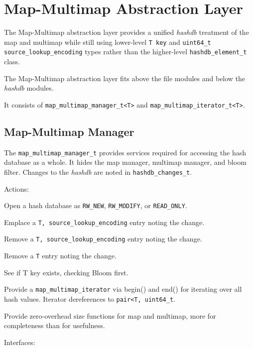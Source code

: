 \documentclass[12pt,twoside]{article}
\newcommand{\hdb}{\emph{hashdb}\xspace}
\begin{document}
\section{Map-Multimap Abstraction Layer}
\begin{compactitem}
\item The Map-Multimap abstraction layer
provides a unified \hdb treatment of the map and multimap
while still using lower-level \texttt{T key}
and \texttt{uint64\_t source\_lookup\_encoding} types
rather than the higher-level \texttt{hashdb\_element\_t} class.
\item The Map-Multimap abstraction layer fits above the file modules
and below the \hdb modules.
\item It consists of \texttt{map\_multimap\_manager\_t<T>}
and \texttt{map\_multimap\_iterator\_t<T>}.
\end{compactitem}

\subsection{Map-Multimap Manager}
The \texttt{map\_multimap\_manager\_t}
provides services required for accessing the hash database
as a whole.  It hides the map manager, multimap manager, and bloom filter.
Changes to the \hdb are noted in \texttt{hashdb\_changes\_t}.

Actions:
\begin{compactitem}
\item Open a hash database as
\texttt{RW\_NEW}, \texttt{RW\_MODIFY}, or \texttt{READ\_ONLY}.
\item Emplace a \texttt{T, source\_lookup\_encoding} entry noting the change.
\item Remove a \texttt{T, source\_lookup\_encoding} entry noting the change.
\item Remove a \texttt{T} entry noting the change.
\item See if T key exists, checking Bloom first.
\item Provide a \texttt{map\_multimap\_iterator} via begin() and end()
for iterating over all hash values.
Iterator dereferences to \texttt{pair<T, uint64\_t}.
\item Provide zero-overhead size functions for map and multimap,
more for completeness than for usefulness.
\end{compactitem}

Interfaces:
\end{document}
